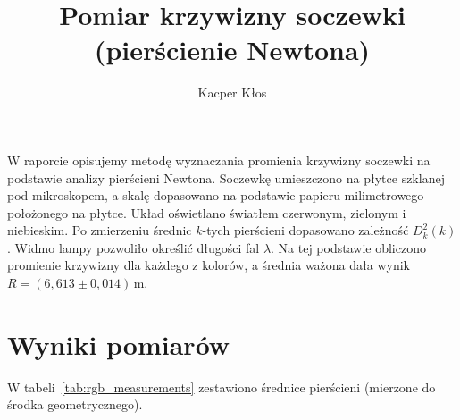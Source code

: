 \documentclass[12pt]{article}
\title{Pomiar krzywizny soczewki (pierścienie Newtona)}
\author{Kacper Kłos}
\begin{document}
\maketitle

W raporcie opisujemy metodę wyznaczania promienia krzywizny soczewki na podstawie analizy pierścieni Newtona.
Soczewkę umieszczono na płytce szklanej pod mikroskopem, a skalę dopasowano na podstawie papieru milimetrowego położonego na płytce.
Układ oświetlano światłem czerwonym, zielonym i niebieskim.
Po zmierzeniu średnic \(k\)-tych pierścieni dopasowano zależność \(D_k^2(k)\).
Widmo lampy pozwoliło określić długości fal \(\lambda\).
Na tej podstawie obliczono promienie krzywizny dla każdego z kolorów, a średnia ważona dała wynik
\(R = (6{,}613 \pm 0{,}014)\,\mathrm{m}\).

\vspace{1 in}

\section{Wyniki pomiarów}

W tabeli~\ref{tab:rgb_measurements} zestawiono średnice pierścieni (mierzone do środka geometrycznego).
\end{document}
